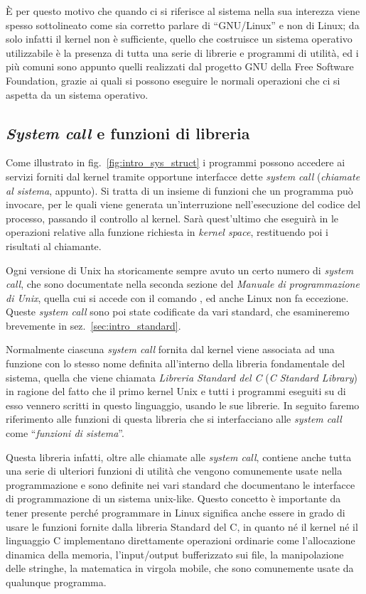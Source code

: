 È per questo motivo che quando ci si riferisce al sistema nella sua interezza
viene spesso sottolineato come sia corretto parlare di ``GNU/Linux'' e non di
Linux; da solo infatti il kernel non è sufficiente, quello che costruisce un
sistema operativo utilizzabile è la presenza di tutta una serie di librerie e
programmi di utilità, ed i più comuni sono appunto quelli realizzati dal
progetto GNU della Free Software Foundation, grazie ai quali si possono
eseguire le normali operazioni che ci si aspetta da un sistema operativo.


\subsection{\textit{System call} e funzioni di libreria}
\label{sec:intro_syscall}

Come illustrato in fig.~\ref{fig:intro_sys_struct} i programmi possono
accedere ai servizi forniti dal kernel tramite opportune interfacce dette
\textit{system call} (\textsl{chiamate al sistema}, appunto). Si tratta di un
insieme di funzioni che un programma può invocare, per le quali viene generata
un'interruzione nell'esecuzione del codice del processo, passando il controllo
al kernel. Sarà quest'ultimo che eseguirà in le operazioni relative alla
funzione richiesta in \textit{kernel space}, restituendo poi i risultati al
chiamante.

Ogni versione di Unix ha storicamente sempre avuto un certo numero di
\textit{system call}, che sono documentate nella seconda sezione del
\textsl{Manuale di programmazione di Unix}, quella cui si accede con il
comando , ed anche Linux non fa eccezione. Queste
\textit{system call} sono poi state codificate da vari standard, che
esamineremo brevemente in sez.~\ref{sec:intro_standard}.

Normalmente ciascuna \textit{system call} fornita dal kernel viene associata
ad una funzione con lo stesso nome definita all'interno della libreria
fondamentale del sistema, quella che viene chiamata \textsl{Libreria Standard
  del C} (\textit{C Standard Library}) in ragione del fatto che il primo
kernel Unix e tutti i programmi eseguiti su di esso vennero scritti in questo
linguaggio, usando le sue librerie. In seguito faremo riferimento alle
funzioni di questa libreria che si interfacciano alle \textit{system call}
come ``\textsl{funzioni di sistema}''.

Questa libreria infatti, oltre alle chiamate alle \textit{system call},
contiene anche tutta una serie di ulteriori funzioni di utilità che vengono
comunemente usate nella programmazione e sono definite nei vari standard che
documentano le interfacce di programmazione di un sistema unix-like. Questo
concetto è importante da tener presente perché programmare in Linux significa
anche essere in grado di usare le funzioni fornite dalla libreria Standard del
C, in quanto né il kernel né il linguaggio C implementano direttamente
operazioni ordinarie come l'allocazione dinamica della memoria, l'input/output
bufferizzato sui file, la manipolazione delle stringhe, la matematica in
virgola mobile, che sono comunemente usate da qualunque programma.

